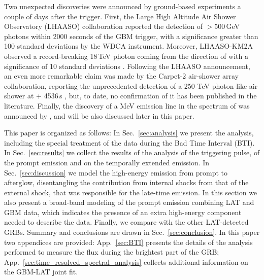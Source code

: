 \documentclass[preprint]{aastex631}
\begin{document}
Two unexpected discoveries were announced by ground-based experiments a couple of days after the trigger. %
First, the Large High Altitude Air Shower Observatory (LHAASO) collaboration reported the detection of $> 500$\,GeV photons within 2000 seconds of the GBM trigger, with a significance greater than 100 standard deviations by the WDCA instrument. Moreover, LHAASO-KM2A observed a record-breaking 18\,TeV photon coming from the direction of \grb with a significance of 10 standard deviations \citep{2022GCN.32677....1H}.
Following the LHAASO announcement, an even more remarkable claim was made by the Carpet-2 air-shower array collaboration, reporting the unprecedented detection of a 250 TeV photon-like air shower at \trig+ 4536\,s \citep{2022ATel15669....1D}, but, to date, no confirmation of it has been published in the literature.
Finally, the discovery of a MeV emission line in the spectrum of \grb was announced by \citet{BOAT_LINE}, and will be also discussed later in this paper.

This paper is organized as follows: In Sec.~\ref{sec:analysis} %
we present the  analysis, including the special treatment of the data during the Bad Time Interval (BTI). 
In Sec.~\ref{sec:results} we collect the results of the analysis of the triggering pulse, of the prompt emission and on the temporally extended emission.
In Sec.~\ref{sec:discussion} we model the high-energy emission from prompt to afterglow, disentangling the contribution from internal shocks from that of the external shock, that was responsible for the late-time emission. In this section we also present a broad-band modeling of the prompt emission combining LAT and GBM data, which indicates the presence of an extra high-energy component needed to describe the data. Finally, we compare \grb with the other LAT-detected GRBs. Summary and conclusions are drawn in Sec.~\ref{sec:conclusion}. In this paper two appendices are provided: App.~\ref{sec:BTI} presents the details of the analysis performed to measure the flux during the brightest part of the GRB; App.~\ref{sec:time_resolved_spectral_analysis} collects additional information on the GBM-LAT joint fit.

\end{document}
